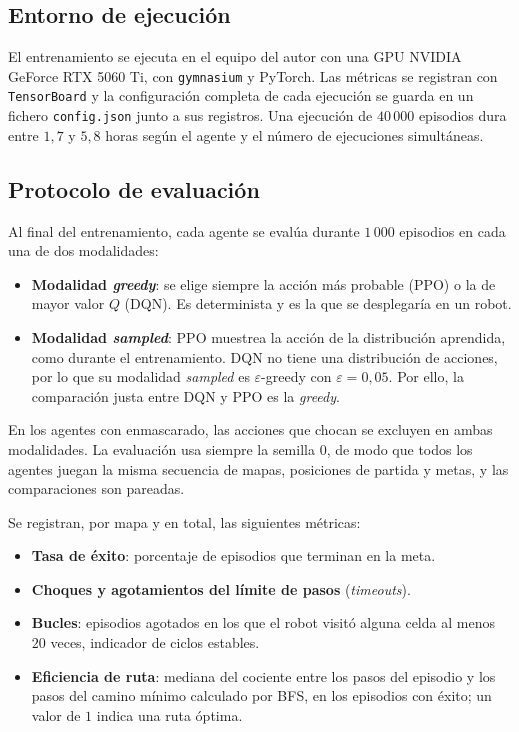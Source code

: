 \subsection{Entorno de ejecución}
El entrenamiento se ejecuta en el equipo del autor con una GPU NVIDIA
GeForce RTX 5060 Ti, con \texttt{gymnasium} y PyTorch. Las métricas se
registran con \texttt{TensorBoard} y la configuración completa de cada
ejecución se guarda en un fichero \texttt{config.json} junto a sus
registros. Una ejecución de $40\,000$ episodios dura entre $1{,}7$ y
$5{,}8$ horas según el agente y el número de ejecuciones simultáneas.

\subsection{Protocolo de evaluación}\label{sec:protocolo}
Al final del entrenamiento, cada agente se evalúa durante $1\,000$
episodios en cada una de dos modalidades:
\begin{itemize}
    \item \textbf{Modalidad \textit{greedy}}: se elige siempre la acción
    más probable (PPO) o la de mayor valor $Q$ (DQN). Es determinista y
    es la que se desplegaría en un robot.
    \item \textbf{Modalidad \textit{sampled}}: PPO muestrea la acción de
    la distribución aprendida, como durante el entrenamiento. DQN no
    tiene una distribución de acciones, por lo que su modalidad
    \textit{sampled} es $\varepsilon$-greedy con $\varepsilon = 0{,}05$. Por
    ello, la comparación justa entre DQN y PPO es la \textit{greedy}.
\end{itemize}
En los agentes con enmascarado, las acciones que chocan se excluyen en
ambas modalidades. La evaluación usa siempre la semilla $0$, de modo que
todos los agentes juegan la misma secuencia de mapas, posiciones de
partida y metas, y las comparaciones son pareadas.

Se registran, por mapa y en total, las siguientes métricas:
\begin{itemize}
    \item \textbf{Tasa de éxito}: porcentaje de episodios que terminan en
    la meta.
    \item \textbf{Choques y agotamientos del límite de pasos}
    (\textit{timeouts}).
    \item \textbf{Bucles}: episodios agotados en los que el robot visitó
    alguna celda al menos $20$ veces, indicador de ciclos estables.
    \item \textbf{Eficiencia de ruta}: mediana del cociente entre los
    pasos del episodio y los pasos del camino mínimo calculado por BFS,
    en los episodios con éxito; un valor de $1$ indica una ruta óptima.
\end{itemize}

